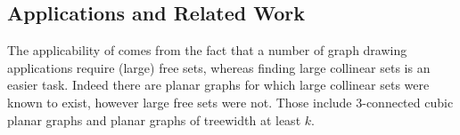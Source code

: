 \subsection{Applications and Related Work}

The applicability of  comes from the fact that a number of graph drawing applications require (large) free sets, whereas finding large collinear sets
is an easier task. Indeed there are planar graphs for which large collinear sets were known to exist, however large free sets were not. Those include 3-connected cubic planar graphs
and planar graphs of treewidth at least $k$.
%



